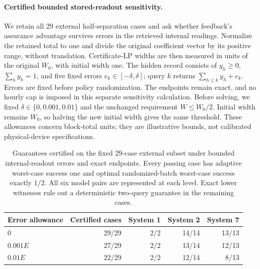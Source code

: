 
\paragraph{Certified bounded stored-readout sensitivity.}\label{sec:stored-error-sensitivity}
We retain all 29 external half-separation cases and ask whether feedback's
assurance advantage survives errors in the retrieved internal readings.
Normalize the retained total to one and divide the original coefficient
vector by its positive range, without translation. Certificate-LP widths
are then measured in units of the original $W_0$, with initial width one.
The hidden record consists of
$y_h\geq0$, $\sum_h y_h=1$, and five fixed errors
$e_k\in[-\delta,\delta]$; query $k$ returns
$\sum_{h\leq k}y_h+e_k$. Errors are fixed before policy randomization.
The endpoints remain exact, and no hourly cap is imposed in this separate
sensitivity calculation. Before solving, we fixed
$\delta\in\{0,0.001,0.01\}$ and the unchanged requirement $W\leq W_0/2$.
Initial width remains $W_0$, so halving the new initial width gives the
same threshold. These allowances concern block-total units; they are
illustrative bounds, not calibrated physical-device specifications.

\begin{table}[htbp]\centering\small
\caption{Guarantees certified on the fixed 29-case external subset under
bounded internal-readout errors and exact endpoints. Every passing case
has adaptive worst-case success one and optimal randomized-batch worst-case
success exactly $1/2$. All six model pairs are represented at each level.
Exact lower witnesses rule out a deterministic two-query guarantee in the
remaining cases.}
\label{tab:stored-error-certificates}
\begin{tabular}{lrrrr}\toprule
Error allowance & Certified cases & System 1 & System 2 & System 7\\\midrule
$0$ & 29/29 & 2/2 & 14/14 & 13/13\\
$0.001E$ & 27/29 & 2/2 & 13/14 & 12/13\\
$0.01E$ & 22/29 & 2/2 & 12/14 & 8/13\\\bottomrule
\end{tabular}\end{table}

